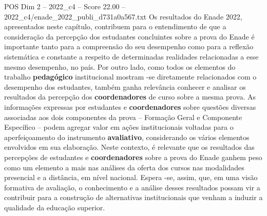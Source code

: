 \begin{textsample}{POS Dim 2 – 2022\_c4 – Score 22.00 – 2022\_c4/enade\_2022\_publi\_d731a0a567.txt}
Os resultados do Enade 2022, apresentados neste capítulo, contribuem para o entendimento de que a consideração da percepção dos estudantes concluintes sobre a prova do Enade é importante tanto para a compreensão do seu desempenho como para a reflexão sistemática e constante a respeito de determinadas realidades relacionadas a esse mesmo desempenho, no país.
Por outro lado, como todos os elementos do trabalho \textbf{pedagógico} institucional mostram -se diretamente relacionados com o desempenho dos estudantes, também ganha relevância conhecer e analisar os resultados da percepção dos \textbf{coordenadores} de curso sobre a mesma prova.
As informações expressas por estudantes e \textbf{coordenadores} sobre questões diversas associadas aos dois componentes da prova – Formação Geral e Componente Específico – podem agregar valor em ações institucionais voltadas para o aperfeiçoamento do instrumento \textbf{avaliativo}, considerando os vários elementos envolvidos em sua elaboração.
Neste contexto, é relevante que os resultados das percepções de estudantes e \textbf{coordenadores} sobre a prova do Enade ganhem peso como um elemento a mais nas análises da oferta dos cursos nas modalidades presencial e a distância, em nível nacional.
Espera -se, assim, que, em uma visão formativa de avaliação, o conhecimento e a análise desses resultados possam vir a contribuir para a construção de alternativas institucionais que venham a induzir a qualidade da educação superior.

\end{textsample}
